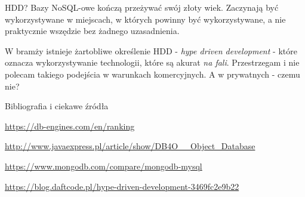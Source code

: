 \begin{frame}[fragile]{HDD?}
	Bazy NoSQL-owe kończą przeżywać swój złoty wiek. Zaczynają być wykorzystywane w miejscach, w których powinny być wykorzystywane, a nie praktycznie wszędzie bez żadnego uzasadnienia.
	
	W bramży istnieje żartobliwe określenie HDD - \emph{hype driven development} - które oznacza wykorzystywanie technologii, które są akurat \emph{na fali}. Przestrzegam i nie polecam takiego podejścia w warunkach komercyjnych. A w prywatnych - czemu nie?
\end{frame}

\begin{frame}{Bibliografia i ciekawe źródła}
  
	\begin{thebibliography}{9}
		
		\url{https://db-engines.com/en/ranking}
		
		\url{http://www.javaexpress.pl/article/show/DB4O__Object_Database}
		
		\url{https://www.mongodb.com/compare/mongodb-mysql}
		
		\url{https://blog.daftcode.pl/hype-driven-development-3469fc2e9b22}
		
	\end{thebibliography}

\end{frame}


